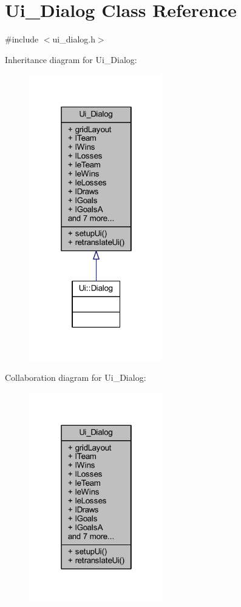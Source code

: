 \hypertarget{class_ui___dialog}{}\section{Ui\+\_\+\+Dialog Class Reference}
\label{class_ui___dialog}


{\ttfamily \#include $<$ui\+\_\+dialog.\+h$>$}



Inheritance diagram for Ui\+\_\+\+Dialog\+:
\nopagebreak
\begin{figure}[H]
\begin{center}
\leavevmode
\includegraphics[width=166pt]{d4/dcd/class_ui___dialog__inherit__graph}
\end{center}
\end{figure}


Collaboration diagram for Ui\+\_\+\+Dialog\+:
\nopagebreak
\begin{figure}[H]
\begin{center}
\leavevmode
\includegraphics[width=166pt]{dc/d2d/class_ui___dialog__coll__graph}
\end{center}
\end{figure}
